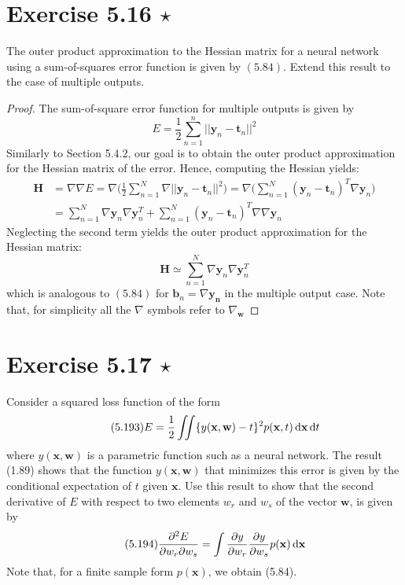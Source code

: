 \section*{Exercise 5.16 $\star$}
The outer product approximation to the Hessian matrix for
a neural network using a sum-of-squares error function is given
by  $(5.84)$. Extend this result to the case of 
multiple outputs.

\vspace{1em}

\begin{proof}
    The sum-of-square error function for multiple outputs is given by
    \[
        E = \frac{1}{2} \sum_{n=1}^n ||\mathbf{y}_n - \mathbf{t}_n||^2
    \] 
    Similarly to Section 5.4.2, our goal is to obtain the outer product
    approximation for the Hessian matrix of the error. Hence,
    computing the Hessian yields:
    \begin{align*}
        \mathbf{H} 
        &= \nabla \nabla E
        = \nabla\bigg(\frac{1}{2} \sum_{n=1}^{N} \nabla ||\mathbf{y}_n - \mathbf{t}_n||^2\bigg)
        = \nabla \bigg(\sum_{n=1}^{N} (\mathbf{y}_n - \mathbf{t}_n)^T \nabla \mathbf{y}_n\bigg) \\
        &= \sum_{n=1}^{N} \nabla \mathbf{y}_n \nabla \mathbf{y}_n^T
        + \sum_{n=1}^{N} (\mathbf{y}_n - \mathbf{t}_n)^T \nabla \nabla \mathbf{y}_n
    \end{align*}
    Neglecting the second term yields the outer product approximation
    for the Hessian matrix:
    \[
        \mathbf{H} \simeq \sum_{n=1}^{N} \nabla \mathbf{y}_n \nabla \mathbf{y}_n^T
    \] 
    which is analogous to $(5.84)$ for $\mathbf{b}_n = \nabla \mathbf{y_n}$
    in the multiple output case.
    Note that, for simplicity all the $\nabla$ symbols refer to $\nabla_\mathbf{w}$ 
\end{proof}

\section*{Exercise 5.17 $\star$}
Consider a squared loss function of the form
\begin{equation}\label{eq:5.193}\tag{5.193}
    E = \frac{1}{2} \iint \{y(\mathbf{x}, \mathbf{w}) - t\}^2 p(\mathbf{x}, t) \mathop{}\!\mathrm{d} \mathbf{x} \mathop{}\!\mathrm{d} t
\end{equation}
where $y(\mathbf{x}, \mathbf{w})$ is a parametric function such as a neural
network. The result (1.89) shows that the function $y(\mathbf{x}, \mathbf{w})$
that minimizes this error is given by the conditional
expectation of $t$ given $\mathbf{x}$. Use this result to show
that the second derivative of $E$ with respect to two elements
$w_r$ and $w_s$ of the vector $\mathbf{w}$, is given by
\begin{equation}\label{eq:5.194}\tag{5.194}
    \pdv{E}{w_r}{w_s} = \int \pdv{y}{w_r} \pdv{y}{w_s} p(\mathbf{x}) \mathop{}\!\mathrm{d} \mathbf{x}
\end{equation}
Note that, for a finite sample form $p(\mathbf{x})$, we obtain
(5.84).


